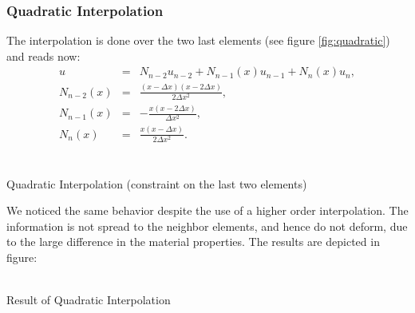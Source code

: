 \documentclass[a4paper,12pt]{article}
\makeatletter
\newenvironment{figurehere}
  {\def\@captype{figure}}
  {}
\makeatother
\begin{document}
\subsubsection{Quadratic Interpolation}
The interpolation is done over the two last elements (see figure \ref{fig:quadratic}) and reads now:
\begin{eqnarray}
u &=& N_{n-2}u_{n-2}+N_{n-1}(x)u_{n-1}+N_n(x)u_n,\\
N_{n-2}(x) &=& \frac{(x-\Delta x)(x-2\Delta x)}{2\Delta x^2},\\
N_{n-1}(x) &=& -\frac{x(x-2\Delta x)}{\Delta x^2},\\
N_{n}(x) &=& \frac{x(x-\Delta x)}{2\Delta x^2}.\\
\end{eqnarray}
\begin{center}
\begin{figurehere}
\scalebox{0.7}{}\\
\caption{Quadratic Interpolation (constraint on the last two elements)}\label{fig:quadratic}
\end{figurehere}
\end{center}
We noticed the same behavior despite the use of a higher order interpolation. The information is not spread to the neighbor elements, and hence do not deform, due to the large difference in the material properties. 
The results are depicted in figure:
\begin{center}
\begin{figurehere}
\\
\caption{Result of Quadratic Interpolation}\label{fig:quadraticResult}
\end{figurehere}
\end{center}
\end{document}
